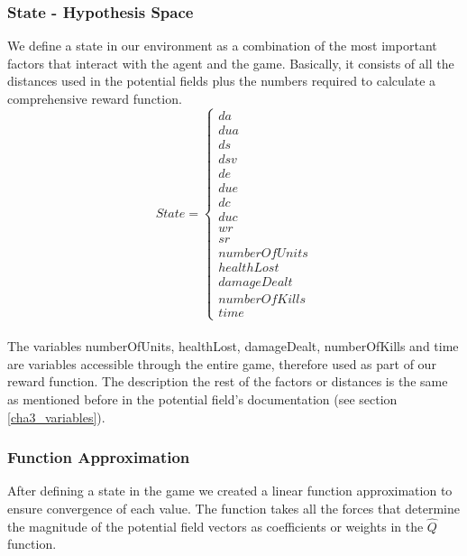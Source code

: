 \subsubsection{State - Hypothesis Space}

We define a state in our environment as a combination of the most important factors that interact with the agent and the game. Basically, it consists of all the distances used in the potential fields plus the numbers required to calculate a comprehensive reward function. \\
\begin{displaymath}
                       State = \begin{cases}
                         da \\  dua \\  ds \\  dsv \\ de \\ due \\ dc \\ duc \\ wr \\ sr \\ numberOfUnits \\ healthLost \\ damageDealt \\ numberOfKills \\ time
                      \end{cases}
\end{displaymath}\\

The variables numberOfUnits, healthLost, damageDealt, numberOfKills and time are variables accessible through the entire game, therefore used as part of our reward function. The description the rest of the factors or distances is the same as mentioned before in the potential field's documentation (see section \ref{cha3_variables}). 

\subsubsection{Function Approximation}

After defining a state in the game we created a linear function approximation to ensure convergence of each value. The function takes all the forces that determine the magnitude of the potential field vectors as coefficients or weights in the $\hat{Q}$ function. \\ 

